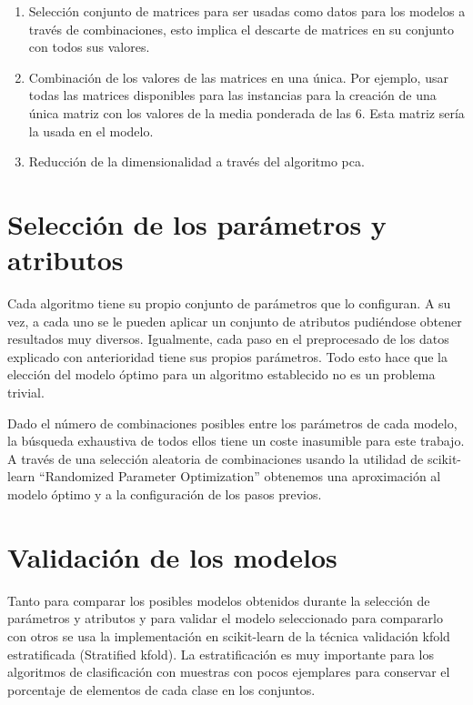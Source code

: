 \begin{enumerate}
    \item Selección conjunto de matrices para ser usadas como datos para los modelos a través de combinaciones, esto implica el descarte de matrices en su conjunto con todos sus valores.
    
    \item Combinación de los valores de las matrices en una única. Por ejemplo, usar todas las matrices disponibles para las instancias para la creación de una única matriz con los valores de la media ponderada de las 6. Esta matriz sería la usada en el modelo.
    
    \item Reducción de la dimensionalidad a través del algoritmo \gls{pca}.
    
\end{enumerate}

\section{Selección de los parámetros y atributos}

Cada algoritmo tiene su propio conjunto de parámetros que lo configuran. A su vez, a cada uno se le pueden aplicar un conjunto de atributos pudiéndose obtener resultados muy diversos. Igualmente, cada paso en el preprocesado de los datos explicado con anterioridad tiene sus propios parámetros. Todo esto hace que la elección del modelo óptimo para un algoritmo establecido no es un problema trivial.

Dado el número de combinaciones posibles entre los parámetros de cada modelo, la búsqueda exhaustiva de todos ellos tiene un coste inasumible para este trabajo. A través de una selección aleatoria de combinaciones usando la utilidad de scikit-learn ``Randomized Parameter Optimization'' obtenemos una aproximación al modelo óptimo y a la configuración de los pasos previos.

\section{Validación de los modelos}
\label{section:validacion}
Tanto para comparar los posibles modelos obtenidos durante la selección de parámetros y atributos y para validar el modelo seleccionado para compararlo con otros se usa la implementación en scikit-learn de la técnica validación \gls{kfold} estratificada (Stratified \gls{kfold}). La estratificación es muy importante para los algoritmos de clasificación con muestras con pocos ejemplares para conservar el porcentaje de elementos de cada clase en los conjuntos.

